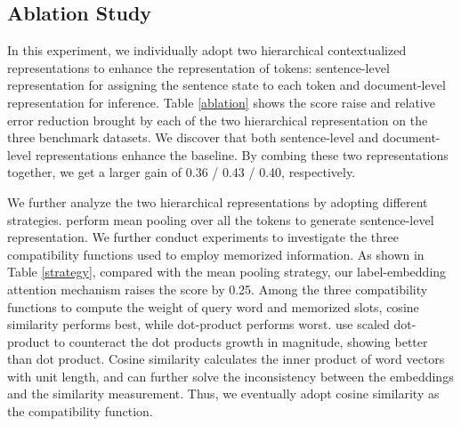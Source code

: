 \documentclass[letterpaper]{article} \usepackage{aaai20}  \usepackage{times}  \usepackage{helvet} \usepackage{courier}  \usepackage[hyphens]{url}  \usepackage{graphicx} \urlstyle{rm} \def\UrlFont{\rm}  \usepackage{graphicx}  \frenchspacing  \setlength{\pdfpagewidth}{8.5in}  \setlength{\pdfpageheight}{11in}
\begin{document}
\begin{table}[t!] 
\centering
{}
\caption{Comparison of different strategies on CoNLL-2003 dataset. ERR is the relative error rate reduction of our model compared to the baseline.}
\label{strategy}
\end{table} 

 \subsection{Ablation Study}
 In this experiment, we individually adopt two hierarchical contextualized representations to enhance the representation of tokens: sentence-level representation for assigning the sentence state to each token and document-level representation for inference. Table \ref{ablation} shows the  score raise and relative error reduction brought by each of the two hierarchical representation on the three benchmark datasets. We discover that both sentence-level and document-level representations enhance the baseline. By combing these two representations together, we get a larger gain of 0.36 / 0.43 / 0.40, respectively.
 
We further analyze the two hierarchical representations by adopting different strategies. \cite{liu2019gcdt} perform mean pooling over all the tokens to generate sentence-level representation. We further conduct experiments to investigate the three compatibility functions used to employ memorized information. As shown in Table \ref{strategy}, compared with the mean pooling strategy, our label-embedding attention mechanism raises the  score by 0.25. Among the three compatibility functions to compute the weight of query word and memorized slots,
cosine similarity performs best, while dot-product performs worst.
\cite{vaswani2017attention} use scaled dot-product to counteract the dot products growth in magnitude, showing better than dot product.
Cosine similarity calculates the inner product of word vectors with unit length, and can further solve the inconsistency between the embeddings and the similarity measurement. Thus, we eventually adopt cosine similarity as the compatibility function.
\end{document}

